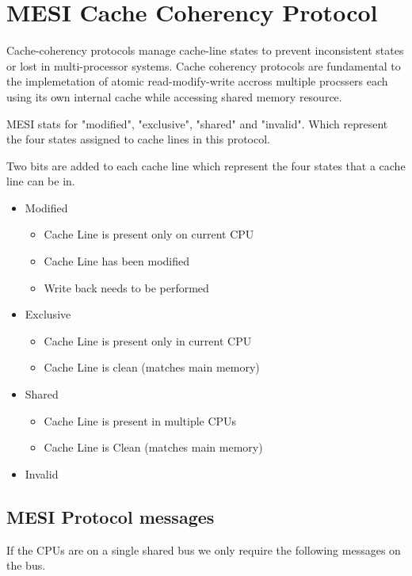 \documentclass{article}
\begin{document}
\section{MESI Cache Coherency Protocol}

Cache-coherency protocols manage cache-line states to prevent
inconsistent states or lost in multi-processor systems.  Cache
coherency protocols are fundamental to the implemetation of atomic
read-modify-write accross multiple procssers each using its own
internal cache while accessing shared memory resource.

MESI stats for "modified", "exclusive", "shared" and "invalid". Which
represent the four states assigned to cache lines in this protocol.

Two bits are added to each cache line which represent the four states
that a cache line can be in.

\begin{itemize}
\item Modified
  \begin{itemize}
    \item Cache Line is present only on current CPU
    \item Cache Line has been modified
    \item Write back needs to be performed
  \end{itemize}


\item Exclusive
    \begin{itemize}
    \item Cache Line is present only in current CPU
    \item Cache Line is clean (matches main memory)
    \end{itemize}
    
  \item Shared
    \begin{itemize}
    \item Cache Line is present in multiple CPUs
    \item Cache Line is Clean (matches main memory)
    \end{itemize}
  \item Invalid 
\end{itemize}

\subsection{MESI Protocol messages}

If the CPUs are on a single shared bus we only require the following
messages on the bus.
\end{document}
